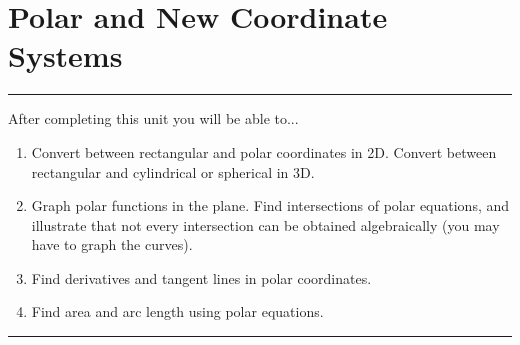 \documentclass[10pt,]{book}
\theoremstyle{plain}
\theoremstyle{definition}
\theoremstyle{definition}
\theoremstyle{definition}
\theoremstyle{definition}
\newenvironment{objectives}[1]{\noindent\rule{\linewidth}{0.1ex}\newline{\textbf{{\large#1}}\par\smallskip}}{\par\noindent\rule{\linewidth}{0.1ex}\par\smallskip}
\theoremstyle{definition}
\numberwithin{equation}{section}
\begin{document}
\begin{exercisegroup}
\end{exercisegroup}
\par\smallskip\noindent
\typeout{************************************************}
\typeout{************************************************}
\chapter[{Polar and New Coordinate Systems}]{Polar and New Coordinate Systems}\label{ch05_coordinates}
\begin{objectives}{Objectives}\label{objectives-8}
After completing this unit you will be able to...%
%
\begin{enumerate}
\item\hypertarget{li-40}{}Convert between rectangular and polar coordinates in 2D. Convert between rectangular and cylindrical or spherical in 3D.%
\item\hypertarget{li-41}{}Graph polar functions in the plane. Find intersections of polar equations, and illustrate that not every intersection can be obtained algebraically (you may have to graph the curves).%
\item\hypertarget{li-42}{}Find derivatives and tangent lines in polar coordinates.%
\item\hypertarget{li-43}{}Find area and arc length using polar equations.%
\end{enumerate}
\end{objectives}
\typeout{************************************************}
\typeout{************************************************}
\end{document}
